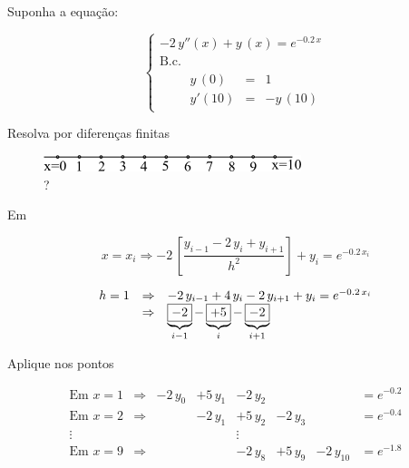\begin{example}

Suponha a equação:

\begin{equation}
 \left\{
 \begin{array}{l}
  - 2 \, y''(x) + y \, (x) = e^{-0.2 \, x} \\
  \mbox{B.c.} \\
  \begin{array}{lll}
   \qquad y\,(0) & = & 1 \\
   \qquad y'(10) & = & -y \, (10)
  \end{array}
 \end{array}
 \right.
\end{equation}

Resolva por diferenças finitas

\begin{figure}[htb]
 \centering
 \includegraphics[scale=1.0]{capitulos/capitulo6/figuras/cond_contorno1.png}
 \caption{?}
 \label{fig:cond_contorno1}
\end{figure}

Em

\[
 x = x_i \Rightarrow - 2 \, \left[ \frac{y_{i-1} - 2 \, y_i + y_{i+1}}{h^2} \right] + y_i = e^{-0.2 \, x_i}
\]

\[
 \begin{array}{lll}
  h = 1 & \Rightarrow & -2 \, y_{i-1} + 4 \, y_i - 2 \, y_{i+1} + y_i = e^{-0.2 \, x_i} \\
        & \Rightarrow & \underbrace{\mbox{\framebox{$-2$}}}_{i-1}-\underbrace{\mbox{\framebox{$+5$}}}_{i}-\underbrace{\mbox{\framebox{$-2$}}}_{i+1}
 \end{array}
\]

Aplique nos pontos 

\[
 \begin{array}{clllllll}
  \mbox{Em } x = 1 & \Rightarrow & -2\,y_0 & +5\,y_1 & -2\,y_2 & & & = e^{-0.2} \nonumber \\
  \mbox{Em } x = 2 & \Rightarrow &         & -2\,y_1 & +5\,y_2 & -2\,y_3 & & = e^{-0.4} \nonumber \\
  \vdots & & & & \vdots & \nonumber \\
  \mbox{Em } x = 9 & \Rightarrow &         &         & -2\,y_8 & +5\,y_9 & -2\,y_{10} & = e^{-1.8} \nonumber \\
 \end{array}
\]

\end{example}
